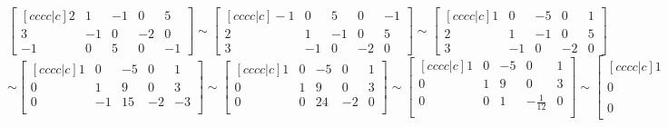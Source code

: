 \documentclass{sbgLAexam}
\begin{document}
\begin{solution}
$$\begin{bmatrix}[cccc|c]
 2 & 1 & -1 & 0 & 5 \\
 3 & -1 & 0 & -2 & 0 \\
 -1 & 0 & 5 & 0 & -1
\end{bmatrix} \sim
\begin{bmatrix}[cccc|c]
 -1 & 0 & 5 & 0 & -1  \\
 2 & 1 & -1 & 0 & 5 \\
 3 & -1 & 0 & -2 & 0
\end{bmatrix} \sim
\begin{bmatrix}[cccc|c]
 1 & 0 & -5 & 0 & 1 \\
 2 & 1 & -1 & 0 & 5 \\
 3 & -1 & 0 & -2 & 0
\end{bmatrix} $$
$$\sim
\begin{bmatrix}[cccc|c]
 1 & 0 & -5 & 0 & 1  \\
 0 & 1 & 9 & 0 & 3 \\
 0 & -1 & 15 & -2 & -3 \\
\end{bmatrix} \sim
\begin{bmatrix}[cccc|c]
 1 & 0 & -5 & 0 & 1  \\
 0 & 1 & 9 & 0 & 3 \\
 0 & 0 & 24 & -2 & 0 \\
\end{bmatrix} \sim
\begin{bmatrix}[cccc|c]
 1 & 0 & -5 & 0 & 1 \\
 0 & 1 & 9 & 0 & 3 \\
 0 & 0 & 1 & -\frac{1}{12} & 0 \\
\end{bmatrix} \sim
\begin{bmatrix}[cccc|c]
1 & 0 & 0 & -\frac{5}{12} & 1 \\
 0 & 1 & 0 & \frac{3}{4} & 3 \\
 0 & 0 & 1 & -\frac{1}{12} & 0
\end{bmatrix}$$
\end{solution}
\end{document}

